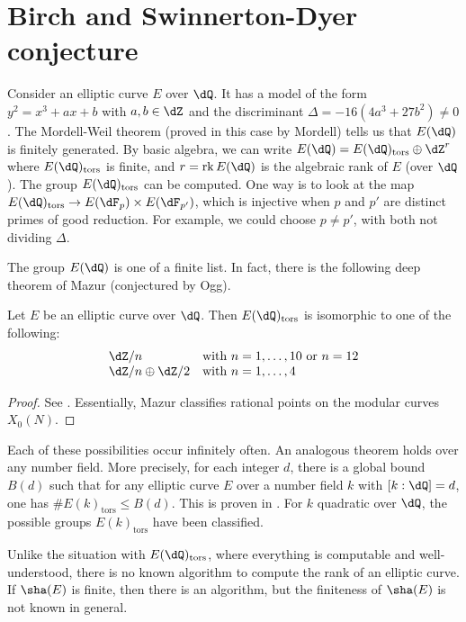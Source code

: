 




\section{Birch and Swinnerton-Dyer conjecture}

Consider an elliptic curve $E$ over $\dQ$. It has a model of the form 
$y^2=x^3+a x+b$ with $a,b\in \dZ$ and the discriminant 
$\Delta=-16(4 a^3+27 b^2)\ne 0$. The Mordell-Weil theorem (proved in this case 
by Mordell) tells us that $E(\dQ)$ is finitely generated. By basic algebra, 
we can write $E(\dQ) = E(\dQ)_\text{tors}\oplus \dZ^r$ where 
$E(\dQ)_\text{tors}$ is finite, and $r=\rank E(\dQ)$ is the algebraic rank of 
$E$ (over $\dQ$). The group $E(\dQ)_\text{tors}$ can be computed. One way is to 
look at the map $E(\dQ)_\text{tors}\to E(\dF_p)\times E(\dF_{p'})$, which is 
injective when $p$ and $p'$ are distinct primes of good reduction. For 
example, we could choose $p\ne p'$, with both not dividing $\Delta$. 

The group $E(\dQ)$ is one of a finite list. In fact, there is the following 
deep theorem of Mazur (conjectured by Ogg).

\begin{theorem}
Let $E$ be an elliptic curve over $\dQ$. Then $E(\dQ)_\textnormal{tors}$ is 
isomorphic to one of the following:
\[
  \begin{array}{ll}
    \dZ/n & \text{with $n=1,\dots,10$ or $n=12$} \\
    \dZ/n\oplus \dZ/2 & \text{with $n=1,\dots,4$}
  \end{array}
\]
\end{theorem}
\begin{proof}
See \cite[III.5.1]{ma77}. Essentially, Mazur classifies rational points on the 
modular curves $X_0(N)$. 
\end{proof}

Each of these possibilities occur infinitely often. An analogous theorem holds 
over any number field. More precisely, for each integer $d$, there is a global 
bound $B(d)$ such that for any elliptic curve $E$ over a number field $k$ with 
$[k:\dQ]=d$, one has $\# E(k)_\text{tors} \leqslant B(d)$. This is proven in 
\cite{me96}. For $k$ quadratic over $\dQ$, the possible groups 
$E(k)_\text{tors}$ have been classified. 

Unlike the situation with $E(\dQ)_\text{tors}$, where everything is computable 
and well-understood, there is no known algorithm to compute the rank of an 
elliptic curve. If $\sha(E)$ is finite, then there is an algorithm, but the 
finiteness of $\sha(E)$ is not known in general. 

